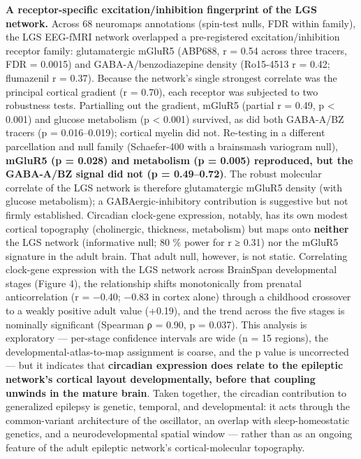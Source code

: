 \documentclass[
]{article}
\begin{document}
\textbf{A receptor-specific excitation/inhibition fingerprint of the LGS
network.} Across 68 neuromaps annotations (spin-test nulls, FDR within
family), the LGS EEG-fMRI network overlapped a pre-registered
excitation/inhibition receptor family: glutamatergic mGluR5 (ABP688, r =
0.54 across three tracers, FDR = 0.0015) and GABA-A/benzodiazepine
density (Ro15-4513 r = 0.42; flumazenil r = 0.37). Because the network's
single strongest correlate was the principal cortical gradient (r =
0.70), each receptor was subjected to two robustness tests. Partialling
out the gradient, mGluR5 (partial r = 0.49, p \textless{} 0.001) and
glucose metabolism (p \textless{} 0.001) survived, as did both GABA-A/BZ
tracers (p = 0.016--0.019); cortical myelin did not. Re-testing in a
different parcellation and null family (Schaefer-400 with a brainsmash
variogram null), \textbf{mGluR5 (p = 0.028) and metabolism (p = 0.005)
reproduced, but the GABA-A/BZ signal did not (p = 0.49--0.72)}. The
robust molecular correlate of the LGS network is therefore glutamatergic
mGluR5 density (with glucose metabolism); a GABAergic-inhibitory
contribution is suggestive but not firmly established. Circadian
clock-gene expression, notably, has its own modest cortical topography
(cholinergic, thickness, metabolism) but maps onto \textbf{neither} the
LGS network (informative null; 80 \% power for \textbar r\textbar{} ≥
0.31) nor the mGluR5 signature in the adult brain. That adult null,
however, is not static. Correlating clock-gene expression with the LGS
network across BrainSpan developmental stages (Figure 4), the
relationship shifts monotonically from prenatal anticorrelation (r =
−0.40; −0.83 in cortex alone) through a childhood crossover to a weakly
positive adult value (+0.19), and the trend across the five stages is
nominally significant (Spearman ρ = 0.90, p = 0.037). This analysis is
exploratory --- per-stage confidence intervals are wide (n = 15
regions), the developmental-atlas-to-map assignment is coarse, and the p
value is uncorrected --- but it indicates that \textbf{circadian
expression does relate to the epileptic network's cortical layout
developmentally, before that coupling unwinds in the mature brain}.
Taken together, the circadian contribution to generalized epilepsy is
genetic, temporal, and developmental: it acts through the common-variant
architecture of the oscillator, an overlap with sleep-homeostatic
genetics, and a neurodevelopmental spatial window --- rather than as an
ongoing feature of the adult epileptic network's cortical-molecular
topography.
\end{document}
